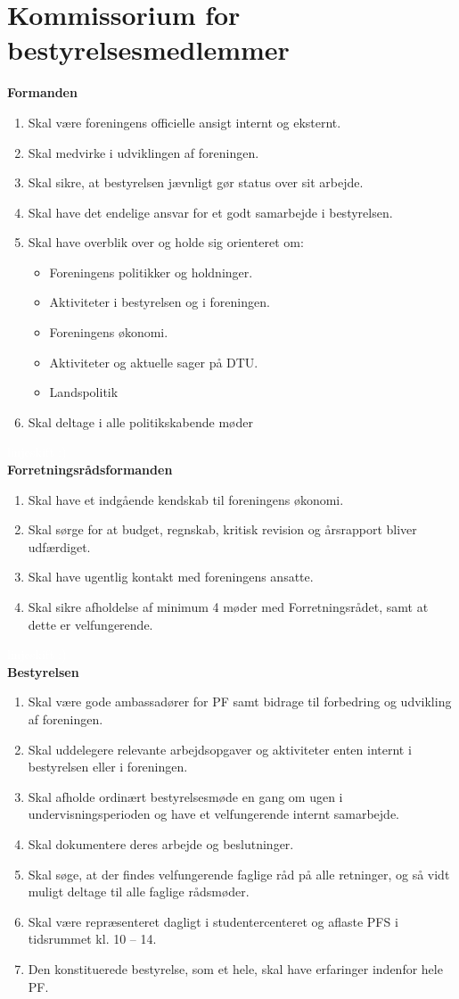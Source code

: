 \section{Kommissorium for bestyrelsesmedlemmer}
\textbf{Formanden}
\begin{enumerate}
\item  Skal være foreningens officielle ansigt internt og eksternt.
\item Skal medvirke i udviklingen af foreningen.
\item Skal sikre, at bestyrelsen jævnligt gør status over sit arbejde.
\item Skal have det endelige ansvar for et godt samarbejde i bestyrelsen.
\item Skal have overblik over og holde sig orienteret om:
\begin{itemize}\addtolength{\itemsep}{-0.5\baselineskip}
\item Foreningens politikker og holdninger.
\item Aktiviteter i bestyrelsen og i foreningen.
\item Foreningens økonomi.
\item Aktiviteter og aktuelle sager på DTU.
\item Landspolitik
\end{itemize}
\item Skal deltage i alle politikskabende møder
\end{enumerate}
\textcolor{white}{linjeskift :)}\\
\textbf{Forretningsrådsformanden}
\begin{enumerate}
\item Skal have et indgående kendskab til foreningens økonomi.
\item Skal sørge for at budget, regnskab, kritisk revision og årsrapport bliver udfærdiget.
\item Skal have ugentlig kontakt med foreningens ansatte.
\item Skal sikre afholdelse af minimum 4 møder med Forretningsrådet, samt at dette er velfungerende.
\end{enumerate}
\textcolor{white}{linjeskift :)}\\
\textbf{Bestyrelsen}
\begin{enumerate}
\item Skal være gode ambassadører for PF samt bidrage til forbedring og udvikling af foreningen.
\item Skal uddelegere relevante arbejdsopgaver og aktiviteter enten internt i bestyrelsen eller i foreningen.
\item Skal afholde ordinært bestyrelsesmøde en gang om ugen i undervisningsperioden og have et velfungerende internt samarbejde.
\item Skal dokumentere deres arbejde og beslutninger.
\item Skal søge, at der findes velfungerende faglige råd på alle retninger, og så vidt muligt deltage til alle faglige rådsmøder.
\item Skal være repræsenteret dagligt i studentercenteret og aflaste PFS i tidsrummet kl. 10 – 14.
\item Den konstituerede bestyrelse, som et hele, skal have erfaringer indenfor hele PF.
\end{enumerate}
